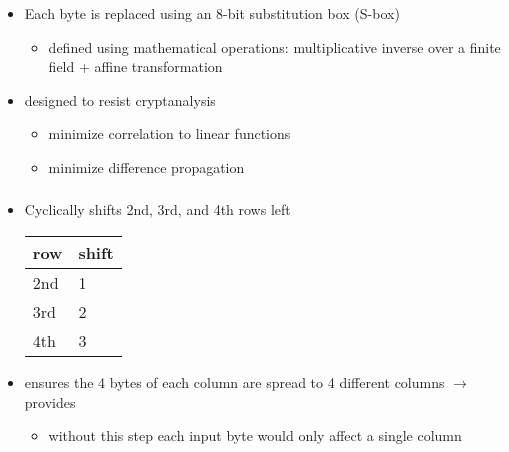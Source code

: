 \documentclass[final]{article}
\begin{document}
\subsubsection*{}
\begin{itemize}[nosep]
    \item Each byte is replaced using an 8-bit substitution box (S-box)
          \begin{itemize}[nosep]
              \item defined using mathematical operations: multiplicative inverse over a finite field + affine transformation
          \end{itemize}
    \item designed to resist cryptanalysis
          \begin{itemize}[nosep]
              \item minimize correlation to linear functions
              \item minimize difference propagation
          \end{itemize}
\end{itemize}
\subsubsection*{}
\begin{itemize}[nosep]
    \item Cyclically shifts 2nd, 3rd, and 4th rows left

          \begin{tabular}{ll}
              row & shift \\\toprule
              2nd & 1     \\
              3rd & 2     \\
              4th & 3     \\\bottomrule
          \end{tabular}
    \item ensures the 4 bytes of each column are spread to 4 different columns $\rightarrow$ provides 
          \begin{itemize}[nosep]
              \item without this step each input byte would only affect a single column
          \end{itemize}
\end{itemize}
\end{document}
